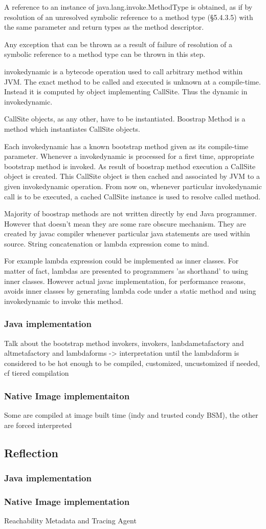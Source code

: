     A reference to an instance of java.lang.invoke.MethodType is obtained, as if by resolution of an unresolved symbolic reference to a method type (§5.4.3.5) with the same parameter and return types as the method descriptor.

    Any exception that can be thrown as a result of failure of resolution of a symbolic reference to a method type can be thrown in this step.


invokedynamic is a bytecode operation used to call arbitrary method within JVM. The exact method to be called and executed is unknown at a compile-time. Instead it is computed by object implementing CallSite. Thus the dynamic in invokedynamic.

CallSite objects, as any other, have to be instantiated. Boostrap Method is a method which instantiates CallSite objects.

Each invokedynamic has a known bootstrap method given as its compile-time parameter. Whenever a invokedynamic is processed for a first time, appropriate bootstrap method is invoked. As result of boostrap method execution a CallSite object is created. This CallSite object is then cached and associated by JVM to a given invokedynamic operation. From now on, whenever particular invokedynamic call is to be executed, a cached CallSite instance is used to resolve called method.

Majority of boostrap methods are not written directly by end Java programmer. However that doesn't mean they are some rare obscure mechanism. They are created by javac compiler whenever particular java statements are used within source. String concatenation or lambda expression come to mind.

For example lambda expression could be implemented as inner classes. For matter of fact, lambdas are presented to programmers 'as shorthand' to using inner classes. However actual javac implementation, for performance reasons, avoids inner classes by generating lambda code under a static method and using invokedynamic to invoke this method.
\subsubsection{Java implementation}
Talk about the bootstrap method invokers, invokers, lanbdametafactory and altmetafactory and lambdaforms -> interpretation until the lambdaform is
considered to be hot enough to be compiled, customized, uncustomized if needed, cf tiered compilation
\subsubsection{Native Image implementaiton}
Some are compiled at image built time (indy and trusted condy BSM), the other are forced interpreted


\subsection{Reflection}

\subsubsection{Java implementation}

\subsubsection{Native Image implementation}
Reachability Metadata and Tracing Agent

 